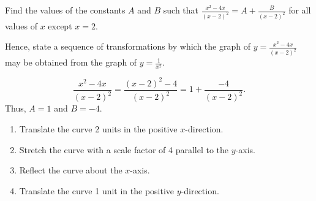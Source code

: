 \begin{problem}
    Find the values of the constants $A$ and $B$ such that $\frac{x^2-4x}{(x-2)^2} = A + \frac{B}{(x-2)^2}$ for all values of $x$ except $x=2$.

    Hence, state a sequence of transformations by which the graph of $y = \frac{x^2-4x}{(x-2)^2}$ may be obtained from the graph of $y = \frac1{x^2}$.
\end{problem}
\begin{solution}
    \[\frac{x^2-4x}{(x-2)^2} = \frac{(x-2)^2 - 4}{(x-2)^2} = 1 + \frac{- 4}{(x-2)^2}.\] Thus, $A = 1$ and $B = -4$.

    \begin{center}
    \end{center}

    \renewcommand{\theenumi}{\arabic{enumi}.}%
    \begin{enumerate}
        \item Translate the curve 2 units in the positive $x$-direction.
        \item Stretch the curve with a scale factor of 4 parallel to the $y$-axis.
        \item Reflect the curve about the $x$-axis.
        \item Translate the curve 1 unit in the positive $y$-direction.
    \end{enumerate}
    \renewcommand{\theenumi}{(\alph{enumi})}
\end{solution}

